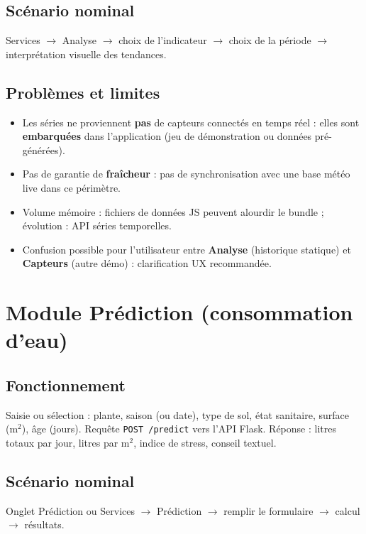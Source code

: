\documentclass[12pt,a4paper,twoside,openright]{report}
\begin{document}
\subsection{Scénario nominal}
Services $\rightarrow$ Analyse $\rightarrow$ choix de l'indicateur $\rightarrow$ choix de la période $\rightarrow$ interprétation visuelle des tendances.

\subsection{Problèmes et limites}
\begin{itemize}
  \item Les séries ne proviennent \textbf{pas} de capteurs connectés en temps réel : elles sont \textbf{embarquées} dans l'application (jeu de démonstration ou données pré-générées).
  \item Pas de garantie de \textbf{fraîcheur} : pas de synchronisation avec une base météo live dans ce périmètre.
  \item Volume mémoire : fichiers de données JS peuvent alourdir le bundle ; évolution : API séries temporelles.
  \item Confusion possible pour l'utilisateur entre \textbf{Analyse} (historique statique) et \textbf{Capteurs} (autre démo) : clarification UX recommandée.
\end{itemize}

\section{Module Prédiction (consommation d'eau)}

\subsection{Fonctionnement}
Saisie ou sélection : plante, saison (ou date), type de sol, état sanitaire, surface (m$^2$), âge (jours). Requête \texttt{POST /predict} vers l'API Flask. Réponse : litres totaux par jour, litres par m$^2$, indice de stress, conseil textuel.

\subsection{Scénario nominal}
Onglet Prédiction ou Services $\rightarrow$ Prédiction $\rightarrow$ remplir le formulaire $\rightarrow$ calcul $\rightarrow$ résultats.
\end{document}
